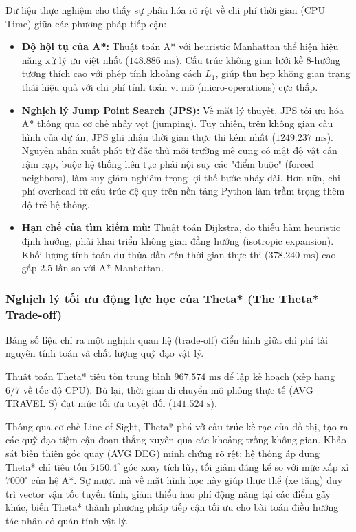 \documentclass[a4paper, 12pt]{report}
\begin{document}
  Dữ liệu thực nghiệm cho thấy sự phân hóa rõ rệt về chi phí thời gian (CPU Time) giữa các phương pháp tiếp cận:

  \begin{itemize}
      \item \textbf{Độ hội tụ của A*:} Thuật toán A* với heuristic Manhattan thể hiện hiệu năng xử lý ưu việt nhất ($148.886\text{ ms}$). Cấu trúc không gian lưới kề $8$-hướng tương thích cao với phép tính khoảng cách $L_1$, giúp thu hẹp không gian trạng thái hiệu quả với chi phí tính toán vi mô (micro-operations) cực thấp.
      \item \textbf{Nghịch lý Jump Point Search (JPS):} Về mặt lý thuyết, JPS tối ưu hóa A* thông qua cơ chế nhảy vọt (jumping). Tuy nhiên, trên không gian cấu hình của dự án, JPS ghi nhận thời gian thực thi kém nhất ($1249.237\text{ ms}$). Nguyên nhân xuất phát từ đặc thù môi trường mê cung có mật độ vật cản rậm rạp, buộc hệ thống liên tục phải nội suy các "điểm buộc" (forced neighbors), làm suy giảm nghiêm trọng lợi thế bước nhảy dài. Hơn nữa, chi phí overhead từ cấu trúc đệ quy trên nền tảng Python làm trầm trọng thêm độ trễ hệ thống.
      \item \textbf{Hạn chế của tìm kiếm mù:} Thuật toán Dijkstra, do thiếu hàm heuristic định hướng, phải khai triển không gian đẳng hướng (isotropic expansion). Khối lượng tính toán dư thừa dẫn đến thời gian thực thi ($378.240\text{ ms}$) cao gấp $2.5$ lần so với A* Manhattan.
  \end{itemize}

  \subsubsection{Nghịch lý tối ưu động lực học của Theta* (The Theta* Trade-off)}

  Bảng số liệu chỉ ra một nghịch quan hệ (trade-off) điển hình giữa chi phí tài nguyên tính toán và chất lượng quỹ đạo vật lý. 

  Thuật toán Theta* tiêu tốn trung bình $967.574\text{ ms}$ để lập kế hoạch (xếp hạng $6/7$ về tốc độ CPU). Bù lại, thời gian di chuyển mô phỏng thực tế (AVG TRAVEL S) đạt mức tối ưu tuyệt đối ($141.524\text{ s}$). 

  Thông qua cơ chế Line-of-Sight, Theta* phá vỡ cấu trúc kề rạc của đồ thị, tạo ra các quỹ đạo tiệm cận đoạn thẳng xuyên qua các khoảng trống không gian. Khảo sát biến thiên góc quay (AVG DEG) minh chứng rõ rệt: hệ thống áp dụng Theta* chỉ tiêu tốn $5150.4^\circ$ góc xoay tích lũy, tối giảm đáng kể so với mức xấp xỉ $7000^\circ$ của hệ A*. Sự mượt mà về mặt hình học này giúp thực thể (xe tăng) duy trì vector vận tốc tuyến tính, giảm thiểu hao phí động năng tại các điểm gãy khúc, biến Theta* thành phương pháp tiếp cận tối ưu cho bài toán điều hướng tác nhân có quán tính vật lý.
\end{document}
